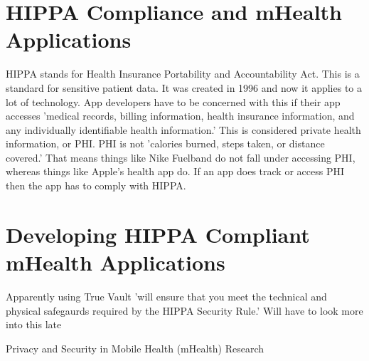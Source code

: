 \documentclass{article}
\begin{document}
\section*{HIPPA Compliance and mHealth Applications}
HIPPA stands for Health Insurance Portability and Accountability Act. This is a standard for sensitive patient data. It was created in 1996 and now it applies to a lot of technology. App developers have to be concerned with this if their app accesses 'medical records, billing information, health insurance information, and any individually identifiable health information.' This is considered private health information, or PHI. PHI is not 'calories burned, steps taken, or distance covered.' That means things like Nike Fuelband do not fall under accessing PHI, whereas things like Apple's health app do. If an app does track or access PHI then the app has to comply with HIPPA. 

\section*{Developing HIPPA Compliant mHealth Applications}
Apparently using True Vault 'will ensure that you meet the technical and physical safegaurds required by the HIPPA Security Rule.' Will have to look more into this late

\newpage
\begin{center}
\Huge Privacy and Security in Mobile Health (mHealth) Research
\end{center}
\end{document}
